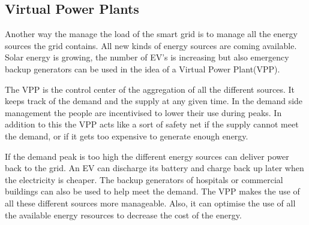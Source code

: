 \subsection{Virtual Power Plants}
Another way the manage the load of the smart grid is to manage all the energy sources the grid contains. All new kinds of energy sources are coming available. Solar energy is growing, the number of EV's is increasing but also emergency backup generators can be used in the idea of a Virtual Power Plant(VPP). 

The VPP is the control center of the aggregation of all the different sources. It keeps track of the demand and the supply at any given time. In the demand side management the people are incentivised to lower their use during peaks. In addition to this the VPP acts like a sort of safety net if the supply cannot meet the demand, or if it gets too expensive to generate enough energy. \cite{vpprealenergy}

If the demand peak is too high the different energy sources can deliver power back to the grid. An EV can discharge its battery and charge back up later when the electricity is cheaper. The backup generators of hospitals or commercial buildings can also be used to help meet the demand. The VPP makes the use of all these different sources more manageable. Also, it can optimise the use of all the available energy resources to decrease the cost of the energy.\cite{microgridsmarketenv}


